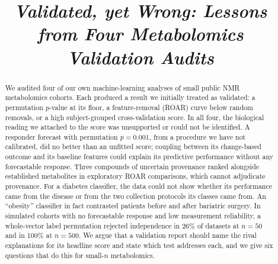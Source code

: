\documentclass[conference]{IEEEtran}
\begin{document}
\title{\itshape Validated, yet Wrong: Lessons from Four Metabolomics Validation Audits}

\author{
\and
{}
}

\maketitle

\begin{abstract}
We audited four of our own machine-learning analyses of small public NMR
metabolomics cohorts. Each produced a result we initially treated as
validated: a permutation $p$-value at its floor, a feature-removal (ROAR)
curve below random removals, or a high subject-grouped cross-validation
score. In all four, the biological reading we attached to the score was
unsupported or could not be identified. A responder forecast with
permutation $p=0.001$, from a procedure we have not calibrated, did no better
than an unfitted score; coupling between its change-based outcome and its
baseline features could explain its predictive performance without any
forecastable response. Three compounds of uncertain provenance ranked
alongside established metabolites in exploratory ROAR comparisons, which
cannot adjudicate provenance. For a diabetes classifier, the data could not
show whether its performance came from the disease or from the two
collection protocols its classes came from. An ``obesity''
classifier in fact contrasted patients before and after bariatric surgery.
In simulated cohorts with no forecastable response and low measurement
reliability, a whole-vector label permutation rejected independence in 26\%
of datasets at $n=50$ and in 100\% at $n=500$. We argue that a validation
report should name the rival explanations for its headline score and state
which test addresses each, and we give six questions that do this for
small-$n$ metabolomics.
\end{abstract}
\end{document}
